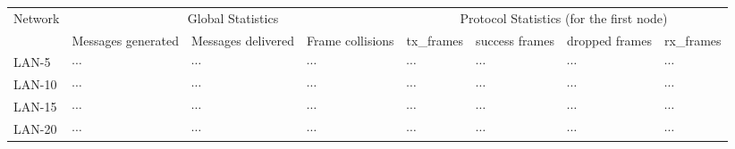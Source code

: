 \documentclass[12pt]{article}
\begin{document}

\begin{center}
\footnotesize
\begin{tabular}{|l || p{0.6in}|p{0.6in}|p{0.6in} || p{0.6in}|p{0.6in}|p{0.6in}|p{0.6in} |}
\hline
Network	&\multicolumn{3}{c||}{Global Statistics}
	&\multicolumn{4}{c|}{Protocol Statistics (for the first node)} \\
	\cline{2-8}
	&Messages generated
	&Messages delivered
	&Frame collisions
	&tx\_frames
	&success frames
	&dropped frames
	&rx\_frames \\
\hline \hline
LAN-5    &$\cdots$ &$\cdots$ &$\cdots$
	 &$\cdots$ &$\cdots$ &$\cdots$ &$\cdots$ \\
\hline
LAN-10    &$\cdots$ &$\cdots$ &$\cdots$
	  &$\cdots$ &$\cdots$ &$\cdots$ &$\cdots$\\
\hline
LAN-15    &$\cdots$ &$\cdots$ &$\cdots$
	  &$\cdots$ &$\cdots$ &$\cdots$ &$\cdots$\\
\hline
LAN-20    &$\cdots$ &$\cdots$ &$\cdots$
	  &$\cdots$ &$\cdots$ &$\cdots$ &$\cdots$\\
\hline
\end{tabular}
\end{center}
\normalsize
\end{document}
